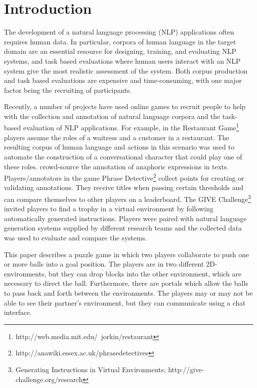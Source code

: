 
\section{Introduction}

The development of a natural language processing (NLP) applications
often requires human data. In particular, corpora of human language in
the target domain are an essential resource for designing, training,
and evaluating NLP systems, and task based evaluations where human
users interact with an NLP system give the most realistic assessment
of the system. Both corpus production and task based evaluations are
expensive and time-consuming, with one major factor being the
recruiting of participants.

Recently, a number of projects have used online games to recruit
people to help with the collection and annotation of natural language
corpora and the task-based evaluation of NLP applications.  For
example, in the Restaurant
Game\footnote{http://web.media.mit.edu/~jorkin/restaurant}
\cite{orkin-roy-2007} players assume the roles of a waitress and a
customer in a restaurant. The resulting corpus of human language and
actions in this scenario was used to automate the construction of a
conversational character that could play one of these roles.
 crowd-source the annotation of anaphoric
expressions in texts. Players/annotators in the game Phrase
Detective\footnote{http://anawiki.essex.ac.uk/phrasedetectives}
collect points for creating or validating annotations. They receive
titles when passing certain thresholds and can compare themselves to
other players on a leaderboard. 
The GIVE Challenge\footnote{Generating Instructions in Virtual
  Environments; http://give-challenge.org/research}
\cite{koller-etal-2010-give1-book,striegnitz-etal-2011-give25} invited
players to find a trophy in a virtual environment by following
automatically generated instructions. Players were paired with natural
language generation systems supplied by different research teams and
the collected data was used to evaluate and compare the systems.

This paper describes a puzzle game in which two players collaborate to
push one or more balls into a goal position. The players are in two
different 2D-environments, but they can drop blocks into the other
environment, which are necessary to direct the ball. Furthermore,
there are portals which allow the balls to pass back and forth between
the environments. The players may or may not be able to see their
partner's environment, but they can communicate using a chat
interface.


